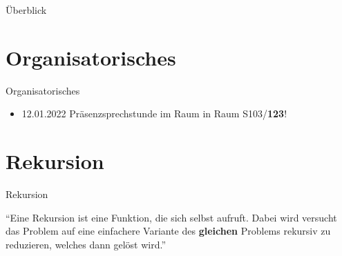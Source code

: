 \documentclass{../tuda-beamer}
\date{15. Dezember 2021}
\begin{document}
    \maketitle

    \begin{frame}{Überblick}
        \tableofcontents
    \end{frame}


    \section{Organisatorisches}
    \begin{frame}{Organisatorisches}
        \begin{itemize}
            \item 12.01.2022 Präsenzsprechstunde im Raum in Raum S103/\textbf{123}!
        \end{itemize}
    \end{frame}


    \section{Rekursion}
    \begin{frame}[c]{Rekursion}
        \begin{center}
            \enquote{Eine Rekursion ist eine Funktion, die sich selbst aufruft. Dabei wird versucht
            das Problem auf eine einfachere Variante des \textbf{gleichen} Problems rekursiv zu
            reduzieren, welches dann gelöst wird.}
        \end{center}
    \end{frame}
\end{document}
